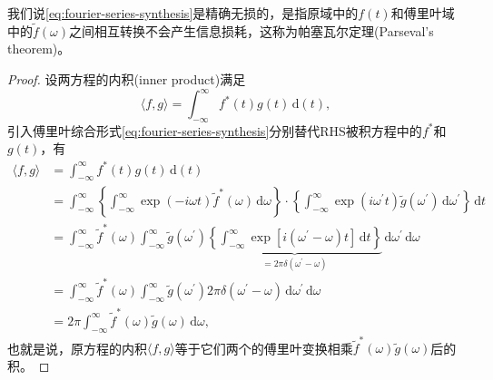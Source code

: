 \begin{theorem}
\label{theorem:fourier-parseval-theorem}
我们说\eqref{eq:fourier-series-synthesis}是精确无损的，是指原域中的$f(t)$和傅里叶域中的$\tilde{f}(\omega)$之间相互转换不会产生信息损耗，这称为帕塞瓦尔定理(Parseval's theorem)。
\end{theorem}
\begin{proof}
  设两方程的内积(inner product)满足
  \begin{equation*}
    \langle f, g \rangle = \int_{-\infty}^{\infty} f^{*}(t) g(t) \, \mathrm{d}(t),
  \end{equation*}
  引入傅里叶综合形式\eqref{eq:fourier-series-synthesis}分别替代RHS被积方程中的$f^{*}$和$g(t)$，有
  \begin{equation}
    \label{eq:fourier-series-parseval-theorem}
    \begin{split}
      \langle f, g \rangle & = \int_{-\infty}^{\infty} f^{*}(t) g(t) \, \mathrm{d}(t) \\
      & = \int_{-\infty}^{\infty}
      \left\{
      \int_{- \infty}^{\infty}
      \exp \left( - i \omega t \right) \tilde{f}^{*} \left( \omega \right) \, \mathrm{d} \omega
      \right\}
      \cdot
      \left\{
      \int_{-\infty}^{\infty}
      \exp \left( i \omega^{'} t \right) \tilde{g} \left( \omega^{'} \right) \, \mathrm{d}\omega^{'}
      \right\}
      \, \mathrm{d} t \\
      & = \int_{-\infty}^{\infty}
      \tilde{f}^{*} \left( \omega \right)
      \int_{-\infty}^{\infty}
      \tilde{g} \left( \omega^{'} \right)
      \underbrace{
      \left\{
      \int_{-\infty}^{\infty}
      \exp \left[ i \left( \omega^{'} - \omega \right) t \right] \, \mathrm{d} t
      \right\}
      }_{= 2 \pi \delta \left( \omega^{'} - \omega \right)}
      \, \mathrm{d} \omega^{'} \, \mathrm{d} \omega \\
      & =
      \int_{-\infty}^{\infty}
      \tilde{f}^{*} \left( \omega \right)
      \int_{-\infty}^{\infty}
      \tilde{g} \left( \omega^{'} \right)
      2 \pi \delta \left( \omega^{'} - \omega \right)
      \, \mathrm{d} \omega^{'} \, \mathrm{d} \omega \\
      & = 2 \pi \int_{-\infty}^{\infty}
      \tilde{f}^{*} \left( \omega \right)
      \tilde{g} \left( \omega \right)
      \, \mathrm{d} \omega,
    \end{split}
  \end{equation}
  也就是说，原方程的内积$\langle f,g \rangle$等于它们两个的傅里叶变换相乘$\tilde{f}^{*}\left( \omega \right) \tilde{g} \left( \omega \right)$后的积。
\end{proof}

